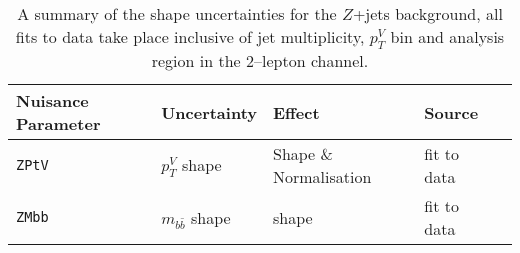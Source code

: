 \begin{table}[!htb]
  \begin{tabular}{lllll}
    \toprule
    {\bfseries Nuisance Parameter} & Uncertainty & Effect & Source  \\
    \midrule
    \texttt{ZPtV} & $p_T^V$ shape & Shape \& Normalisation &  fit to data \\
    \texttt{ZMbb} & $m_{b\bar{b}}$ shape & shape 	& fit to data \\
    \bottomrule
  \end{tabular}
  \caption{A summary of the shape uncertainties for the $Z$+jets background, all
    fits to data take place inclusive of jet multiplicity, $p_T^V$ bin and
    analysis region in the 2--lepton channel.}
  \label{tab:zjets-shapes}
\end{table}
